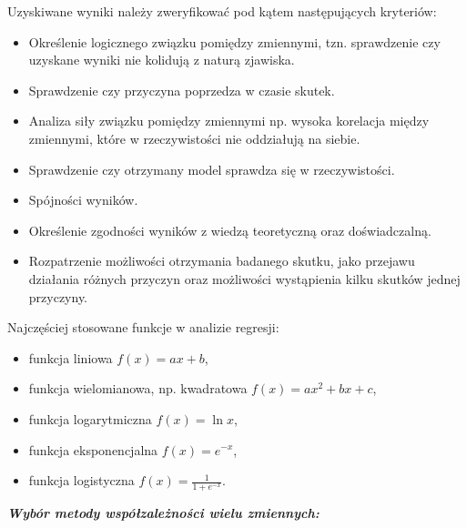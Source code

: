 \documentclass[
  polish,
  letterpaper,
  DIV=11,
  numbers=noendperiod]{scrreprt}
\providecommand{\tightlist}{%
  \setlength{\itemsep}{0pt}\setlength{\parskip}{0pt}}
\begin{document}
Uzyskiwane wyniki należy zweryfikować pod kątem następujących kryteriów:

\begin{itemize}
\tightlist
\item
  Określenie logicznego związku pomiędzy zmiennymi, tzn. sprawdzenie czy
  uzyskane wyniki nie kolidują z naturą zjawiska.
\item
  Sprawdzenie czy przyczyna poprzedza w czasie skutek.
\item
  Analiza siły związku pomiędzy zmiennymi np. wysoka korelacja między
  zmiennymi, które w rzeczywistości nie oddziałują na siebie.
\item
  Sprawdzenie czy otrzymany model sprawdza się w rzeczywistości.
\item
  Spójności wyników.
\item
  Określenie zgodności wyników z wiedzą teoretyczną oraz doświadczalną.
\item
  Rozpatrzenie możliwości otrzymania badanego skutku, jako przejawu
  działania różnych przyczyn oraz możliwości wystąpienia kilku skutków
  jednej przyczyny.
\end{itemize}

Najczęściej stosowane funkcje w analizie regresji:

\begin{itemize}
\tightlist
\item
  funkcja liniowa \(f(x)=ax+b\),
\item
  funkcja wielomianowa, np. kwadratowa \(f(x)=ax^2+bx+c\),
\item
  funkcja logarytmiczna \(f(x) = \ln x\),
\item
  funkcja eksponencjalna \(f(x)=e^{-x}\),
\item
  funkcja logistyczna \(f(x) = \frac{1}{1+e^{-x}}\).
\end{itemize}

\textbf{\emph{Wybór metody współzależności wielu zmiennych:}}
\end{document}

